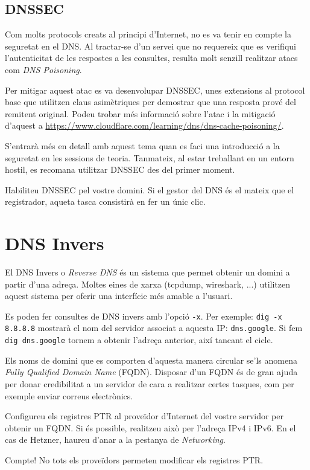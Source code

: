\documentclass{practicaitic}
\begin{document}
\subsection{DNSSEC}

Com molts protocols creats al principi d'Internet, no es va tenir en compte
la seguretat en el DNS. Al tractar-se d'un servei que no requereix que es
verifiqui l'autenticitat de les respostes a les consultes, resulta molt
senzill realitzar atacs com \textit{DNS Poisoning}.

Per mitigar aquest atac es va desenvolupar DNSSEC, unes extensions al
protocol base que utilitzen claus asimètriques per demostrar que una
resposta prové del remitent original.
Podeu trobar més informació sobre l'atac i la mitigació d'aquest a
\url{https://www.cloudflare.com/learning/dns/dns-cache-poisoning/}.

S'entrarà més en detall amb aquest tema quan es faci una introducció a la
seguretat en les sessions de teoria. Tanmateix, al estar treballant en un
entorn hostil, es recomana utilitzar DNSSEC des del primer moment.

\begin{tasca}
  Habiliteu DNSSEC pel vostre domini. Si el gestor del DNS és el mateix
  que el registrador, aqueta tasca consistirà en fer un únic clic.
\end{tasca}

\section{DNS Invers}

El DNS Invers o \textit{Reverse DNS} és un sistema que permet obtenir un
domini a partir d'una adreça. Moltes eines de xarxa (tcpdump, wireshark, ...)
utilitzen aquest sistema per oferir una interfície més amable a l'usuari.

Es poden fer consultes de DNS invers amb l'opció \verb|-x|.
Per exemple: \verb|dig -x 8.8.8.8| mostrarà el nom del servidor associat
a aquesta IP: \verb|dns.google|. Si fem \verb|dig dns.google| tornem a obtenir
l'adreça anterior, així tancant el cicle.

Els noms de domini que es comporten d'aquesta manera circular se'ls anomena
\textit{Fully Qualified Domain Name} (FQDN). Disposar d'un FQDN és de gran
ajuda per donar credibilitat a un servidor de cara a realitzar certes tasques,
com per exemple enviar correus electrònics.

\begin{tasca}
  Configureu els registres PTR al proveïdor d'Internet del vostre servidor per
  obtenir un FQDN. Si és possible, realitzeu això per l'adreça IPv4 i IPv6.
  En el cas de Hetzner, haureu d'anar a la pestanya de \textit{Networking}.

  Compte! No tots els proveïdors permeten modificar els registres PTR.
\end{tasca}
\end{document}
